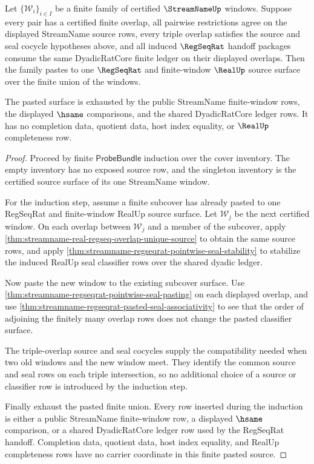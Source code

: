 \begin{theorem}
\label{thm:streamname-regseqrat-finite-cover-pasted-source-exhaustion}
Let $\{\mathcal{W}_i\}_{i\in I}$ be a finite family of certified
$\StreamNameUp$ windows. Suppose every pair has a certified finite overlap,
all pairwise restrictions agree on the displayed StreamName source rows, every
triple overlap satisfies the source and seal cocycle hypotheses above, and all
induced $\RegSeqRat$ handoff packages consume the same DyadicRatCore finite
ledger on their displayed overlaps. Then the family pastes to one
$\RegSeqRat$ and finite-window $\RealUp$ source surface over the finite union
of the windows.

The pasted surface is exhausted by the public StreamName finite-window rows,
the displayed $\hsame$ comparisons, and the shared DyadicRatCore ledger rows.
It has no completion data, quotient data, host index equality, or $\RealUp$
completeness row.
\end{theorem}
\begin{proof}
Proceed by finite $\mathsf{ProbeBundle}$ induction over the cover inventory.
The empty inventory has no exposed source row, and the singleton inventory is
the certified source surface of its one StreamName window.

For the induction step, assume a finite subcover has already pasted to one
RegSeqRat and finite-window RealUp source surface. Let $\mathcal{W}_j$ be the
next certified window. On each overlap between $\mathcal{W}_j$ and a member of
the subcover, apply
\autoref{thm:streamname-real-regseq-overlap-unique-source} to obtain the same
source rows, and apply
\autoref{thm:streamname-regseqrat-pointwise-seal-stability} to stabilize the
induced RealUp seal classifier rows over the shared dyadic ledger.

Now paste the new window to the existing subcover surface. Use
\autoref{thm:streamname-regseqrat-pointwise-seal-pasting} on each displayed
overlap, and use
\autoref{thm:streamname-regseqrat-pasted-seal-associativity} to see that the
order of adjoining the finitely many overlap rows does not change the pasted
classifier surface.

The triple-overlap source and seal cocycles supply the compatibility needed
when two old windows and the new window meet. They identify the common source
and seal rows on each triple intersection, so no additional choice of a source
or classifier row is introduced by the induction step.

Finally exhaust the pasted finite union. Every row inserted during the
induction is either a public StreamName finite-window row, a displayed
$\hsame$ comparison, or a shared DyadicRatCore ledger row used by the RegSeqRat
handoff. Completion data, quotient data, host index equality, and RealUp
completeness rows have no carrier coordinate in this finite pasted source.
\end{proof}

